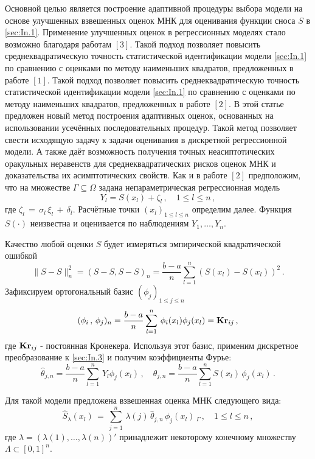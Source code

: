  Основной целью является построение адаптивной процедуры выбора модели на основе улучшенных взвешенных оценок МНК для оценивания функции сноса $S$ в \eqref{sec:In.1}. Применение улучшенных оценок в регрессионных моделях стало возможно благодаря работам $[3]$. Такой подход позволяет повысить среднеквадратическую точность статистической идентификации модели \eqref{sec:In.1} по сравнению с оценками по методу наименьших квадратов, предложенных в работе $[1]$. Такой подход позволяет повысить среднеквадратическую точность статистической идентификации модели \eqref{sec:In.1} по сравнению с оценками по методу наименьших квадратов, предложенных в работе $[2]$. В этой статье предложен новый метод построения адаптивных оценок, основанных на использовании усечённых последовательных процедур. Такой метод позволяет свести исходящую задачу к задачи оценивания в дискретной регрессионной модели. А также  даёт возможность получения точных неасиптотических оракульных неравенств для среднеквадратических рисков оценок МНК и доказательства их асимптотических свойств.
 Как и в работе $[2]$ предположим, что на множестве $\Gamma\subseteq\Omega$
задана непараметрическая регрессионная модель
\begin{equation}\label{sec:In.3}
Y_{l}=S(x_{l})+\zeta_{l}\,,\quad  1\leqslant l\leqslant n\,,
\end{equation}
где $\zeta_{l}\,=\,\sigma_{l}\,\xi_{l}\,+\,\delta_{l}$. Расчётные точки
$(x_{l})_{1\leqslant l\leqslant n}$
определим далее. Функция $S(\cdot)$ неизвестна и оценивается по наблюдениям $Y_1,\ldots,Y_n$.

Качество любой оценки  ${S}$ будет измеряться эмпирической квадратической ошибкой
$$
\|{S}-S\|^2_n=({S}-S,{S}-S)_{n}
=\frac{b-a}{n}\sum^n_{l=1}({S}(x_{l})-S(x_{l}))^2\,.
$$
Зафиксируем ортогональный базис $(\phi_{j})_{1\leqslant j\leqslant n}$
\begin{equation}\label{sec:In.6}
(\phi_i\,,\,\phi_{j})_{n}=
\frac{b-a}{n} \sum^n_{l=1}\,\phi_i(x_{l})\phi_{j}(x_{l})= {\bf Kr}_{ij}\,,
\end{equation}
где ${\bf Kr}_{ij}$ - постоянная Кронекера.
Используя этот базис, применим дискретное преобразование к
\eqref{sec:In.3} и получим коэффициенты Фурье:
$$
{\hat \theta}_{j,n}=\frac{b-a}{n}\sum^n_{l=1}\,Y_{l}\phi_{j}(x_{l})\,,
\quad
\theta_{j,n}=\frac{b-a}{n}\sum^n_{l=1}S(x_{l})\,\phi_{j}(x_{l})\,.
$$

Для такой модели предложена взвешенная оценка МНК следующего вида:
\begin{equation}\label{sec:In.7}
\hat {{S}}_{\lambda}(x_{l})\,=\,\sum^n_{j=1}\,\lambda(j)\,{\hat \theta}_{j,n}\,\phi_{j}(x_{l})\,
_{\Gamma}\,,\quad 1\leqslant l\leqslant n\,,
\end{equation}
где $\lambda=(\lambda(1),\ldots,\lambda(n))'$
принадлежит некоторому конечному множеству $\Lambda\subset [0,1]^n$.

